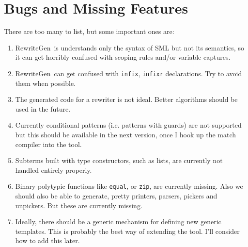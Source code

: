 \documentclass{article}
\newcommand{\RewriteGen}{{\sf RewriteGen}}
\begin{document}
\section{Bugs and Missing Features}
    There are too many to list, but some important ones are:
  \begin{enumerate}
  \item
   \RewriteGen\ is understands only the syntax of SML but not its semantics,
so it can get horribly confused with scoping rules and/or variable captures.

   \item \RewriteGen\ can get confused with \verb|infix|, \verb|infixr|
        declarations.  Try to avoid them when possible.
  \item
    The generated code for a rewriter is not ideal.  Better algorithms
    should be used in the future.

  \item
   Currently conditional patterns (i.e. patterns with guards) 
are not supported but this should be available in the next version, 
once I hook up the match compiler into the tool.

  \item
   Subterms built with type constructors, such as lists, are currently not
handled entirely properly.  

  \item
   Binary polytypic functions like \verb|equal|, or \verb|zip|, are currently
missing.  Also we should also be able to generate, pretty printers, 
parsers,  pickers and unpickers.  But these are currently missing. 

  \item
   Ideally, there should be a generic mechanism for defining new 
generic templates.  This is probably the best way of extending the
tool.   I'll consider how to add this later.
\end{enumerate}
\end{document}
